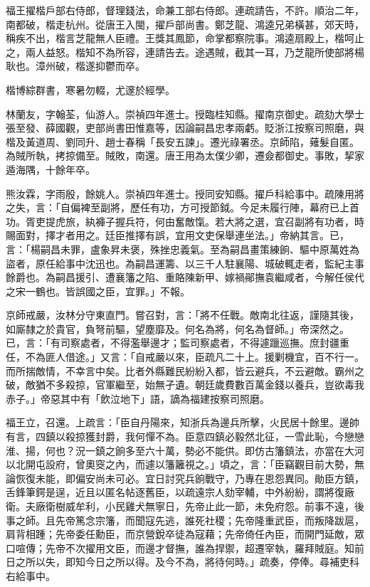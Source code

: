 \begin{pinyinscope}
福王擢楷戶部右侍郎，督理錢法，命兼工部右侍郎。連疏請告，不許。順治二年，南都破，楷走杭州。從唐王入閩，擢戶部尚書。鄭芝龍、鴻逵兄弟橫甚，郊天時，稱疾不出，楷言芝龍無人臣禮。王獎其鳳節，命掌都察院事。鴻逵扇殿上，楷呵止之，兩人益怒。楷知不為所容，連請告去。途遇賊，截其一耳，乃芝龍所使部將楊耿也。漳州破，楷遂抑鬱而卒。

楷博綜群書，寒暑勿輟，尤邃於經學。

林蘭友，字翰荃，仙游人。崇禎四年進士。授臨桂知縣。擢南京御史。疏劾大學士張至發、薛國觀，吏部尚書田惟嘉等，因論嗣昌忠孝兩虧。貶浙江按察司照磨，與楷及黃道周、劉同升、趙士春稱「長安五諫」。遷光祿署丞。京師陷，薙髮自匿。為賊所執，拷掠備至。賊敗，南還。唐王用為太僕少卿，遷僉都御史。事敗，挈家遁海隅，十餘年卒。

熊汝霖，字雨殷，餘姚人。崇禎四年進士。授同安知縣。擢戶科給事中。疏陳用將之失，言：「自偏裨至副將，歷任有功，方可授節鉞。今足未履行陣，幕府已上首功。胥吏提虎旅，紈褲子握兵符，何由奮敵愾。若大將之選，宜召副將有功者，時賜面對，擇才者用之。廷臣推擇有誤，宜用文吏保舉連坐法。」帝納其言。已，言：「楊嗣昌未罪，盧象昇未褒，殊挫忠義氣。至為嗣昌畫策練餉、驅中原萬姓為盜者，原任給事中沈迅也。為嗣昌運籌、以三千人駐襄陽、城破輒走者，監紀主事餘爵也。為嗣昌援引、遭襄籓之陷、重賂陳新甲、嫁禍鄖撫袁繼咸者，今解任侯代之宋一鶴也。皆誤國之臣，宜罪。」不報。

京師戒嚴，汝林分守東直門。嘗召對，言：「將不任戰。敵南北往返，謹隨其後，如廝隸之於貴官，負弩前驅，望塵靡及。何名為將，何名為督師。」帝深然之。已，言：「有司察處者，不得濫舉邊才；監司察處者，不得遽躐巡撫。庶封疆重任，不為匪人借途。」又言：「自戒嚴以來，臣疏凡二十上。援剿機宜，百不行一。而所揣敵情，不幸言中矣。比者外縣難民紛紛入都，皆云避兵，不云避敵。霸州之破，敵猶不多殺掠，官軍繼至，始無孑遺。朝廷歲費數百萬金錢以養兵，豈欲毒我赤子。」帝惡其中有「飲泣地下」語，謫為福建按察司照磨。

福王立，召還。上疏言：「臣自丹陽來，知浙兵為邊兵所擊，火民居十餘里。邊帥有言，四鎮以殺掠獲封爵，我何憚不為。臣意四鎮必毅然北征，一雪此恥，今戀戀淮、揚，何也？況一鎮之餉多至六十萬，勢必不能供。即仿古籓鎮法，亦當在大河以北開屯設府，曾奧窔之內，而遽以籓籬視之。」頃之，言：「臣竊觀目前大勢，無論恢復未能，即偏安尚未可必。宜日討究兵餉戰守，乃專在恩怨異同。勛臣方鎮，舌鋒筆鍔是逞，近且以匿名帖逐舊臣，以疏遠宗人劾宰輔，中外紛紛，謂將復廠衛。夫廠衛樹威牟利，小民雞犬無寧日，先帝止此一節，未免府怨。前事不遠，後事之師。且先帝篤念宗籓，而聞寇先逃，誰死社稷；先帝隆重武臣，而叛降跋扈，肩背相踵；先帝委任勳臣，而京營銳卒徒為寇藉；先帝倚任內臣，而開門延敵，眾口喧傳；先帝不次擢用文臣，而邊才督撫，誰為捍禦，超遷宰執，羅拜賊庭。知前日之所以失，即知今日之所以得。及今不為，將待何時。」疏奏，停俸。尋補吏科右給事中。


\end{pinyinscope}
